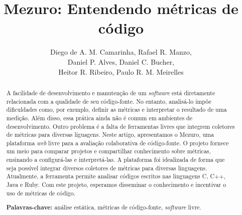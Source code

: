 \documentclass{llncs}
\begin{document}
\sloppy
\title{Mezuro: Entendendo métricas de código}

\author{Diego de A. M. Camarinha, Rafael R. Manzo,\\
        Daniel P. Alves, Daniel C. Bucher, \\
        Heitor R. Ribeiro, Paulo R. M. Meirelles}


\maketitle
\begin{abstract}
  A facilidade de desenvolvimento e manutenção de um \textit{software} está diretamente relacionada com a qualidade de seu código-fonte.
  No entanto, analisá-lo impõe dificuldades como, por exemplo, definir as métricas e interpretar o resultado de uma medição. Além disso, essa prática ainda não é comum em ambientes de desenvolvimento. Outro problema é a falta de ferramentas livres que integrem coletores de métricas para diversas liguagens.
  Neste artigo, apresentamos o Mezuro, uma plataforma \textit{web} livre para a avaliação colaborativa de código-fonte. O projeto fornece um meio para comparar projetos e compartilhar conhecimento sobre métricas, ensinando a configurá-las e interpretá-las. A plataforma foi idealizada de forma que seja possível integrar diversos coletores de métricas para diversas linguagens. Atualmente, a ferramenta permite analisar códigos escritos nas linguagens C, C++, Java e Ruby.
  Com este projeto, esperamos disseminar o conhecimento e incentivar o uso de métricas de código.

\textbf{Palavras-chave:} análise estática, métricas de código-fonte, \textit{software} livre.
\end{abstract}
\end{document}

